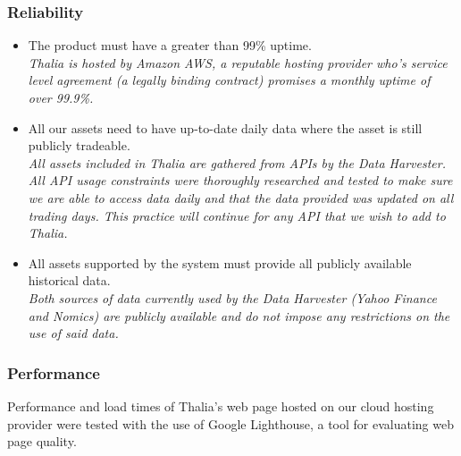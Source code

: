 \documentclass[main.tex]{subfiles}
\begin{document}
\subsubsection{Reliability}
\begin{itemize}

\item The product must have a greater than 99\% uptime.\\
\textit{Thalia is hosted by Amazon AWS, a reputable hosting provider who’s service level agreement (a legally binding contract) promises a monthly uptime of over 99.9\%\cite{amazonSLA}.}

\item All our assets need to have up-to-date daily data where the asset is still publicly tradeable.\\
\textit{All assets included in Thalia are gathered from APIs by the Data Harvester. All API usage constraints were thoroughly researched and tested to make sure we are able to access data daily and that the data provided was updated on all trading days. This practice will continue for any API that we wish to add to Thalia.}

\item All assets supported by the system must provide all publicly available historical data.\\
\textit{Both sources of data currently used by the Data Harvester (Yahoo Finance and Nomics) are publicly available and do not impose any restrictions on the use of said data.}

\end{itemize}

\subsubsection{Performance}
Performance and load times of Thalia's web page hosted on our cloud hosting provider were tested with the use of Google Lighthouse\cite{GoogleLighthouse}, a tool for evaluating web page quality.
\end{document}
